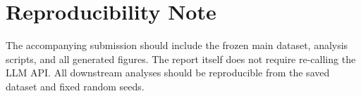 ﻿\documentclass[sigconf,nonacm]{acmart}
\begin{document}
\section*{Reproducibility Note}
The accompanying submission should include the frozen main dataset, analysis scripts, and all generated figures. The report itself does not require re-calling the LLM API. All downstream analyses should be reproducible from the saved dataset and fixed random seeds.

\balance


\end{document}

